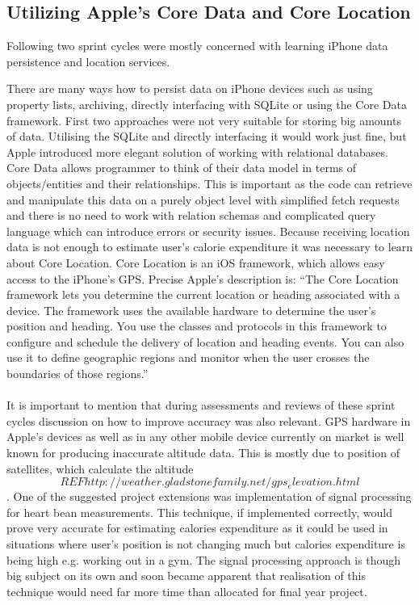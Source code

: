 \documentclass[12pt, a4paper]{report}   %
\begin{document}
\begin{enumerate}
\clearpage
\section{Utilizing Apple's Core Data and Core Location}
Following two sprint cycles were mostly concerned with learning iPhone data persistence and location services.

There are many ways how to persist data on iPhone devices such as using property lists, archiving, directly interfacing with SQLite or using the Core Data framework. First two approaches were not very suitable for storing big amounts of data. Utilising the SQLite and directly interfacing it would work just fine, but Apple introduced more elegant solution of working with relational databases. Core Data allows programmer to think of their data model in terms of objects/entities and their relationships. This is important as the code can retrieve and manipulate this data on a purely object level with simplified fetch requests and there is no need to work with relation schemas and complicated query language which can introduce errors or security issues.
Because receiving location data is not enough to estimate user's calorie expenditure it was necessary to learn about Core Location.
Core Location is an iOS framework, which allows easy access to the iPhone's GPS. Precise Apple's description is:
“The Core Location framework lets you determine the current location or heading associated with a device. The framework uses the available hardware to determine the user's position and heading. You use the classes and protocols in this framework to configure and schedule the delivery of location and heading events. You can also use it to define geographic regions and monitor when the user crosses the boundaries of those regions.”\\ \\
It is important to mention that during assessments and reviews of these sprint cycles discussion on how to improve accuracy was also relevant. GPS hardware in Apple's devices as well as in any other mobile device currently on market is well known for producing inaccurate altitude data. This is mostly due to position of satellites, which calculate the altitude \[REF http://weather.gladstonefamily.net/gps_elevation.html\]. One of the suggested project extensions was implementation of signal processing for heart bean measurements. This technique, if implemented correctly, would prove very accurate for estimating calories expenditure as it could be used in situations where user's position is not changing much but calories expenditure is being high e.g. working out in a gym. The signal processing approach is though big subject on its own and soon became apparent that realisation of this technique would need far more time than allocated for final year project.\\ \\

\end{enumerate}
\end{document}

